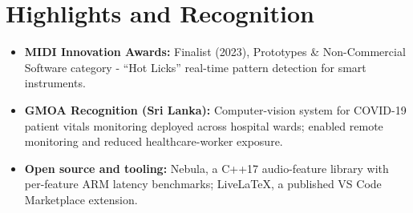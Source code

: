 \documentclass[11pt]{article}
\begin{document}
\enlargethispage{4\baselineskip}
\section*{Highlights and Recognition}
\begin{itemize}[leftmargin=1.2em, itemsep=-0.25em]
    \item \textbf{MIDI Innovation Awards:} Finalist (2023), Prototypes \& Non-Commercial Software category - ``Hot Licks'' real-time pattern detection for smart instruments.
    \item \textbf{GMOA Recognition (Sri Lanka):} Computer-vision system for COVID-19 patient vitals monitoring deployed across hospital wards; enabled remote monitoring and reduced healthcare-worker exposure.
    \item \textbf{Open source and tooling:} Nebula, a C++17 audio-feature library with per-feature ARM latency benchmarks; LiveLaTeX, a published VS Code Marketplace extension.
\end{itemize}
\end{document}
